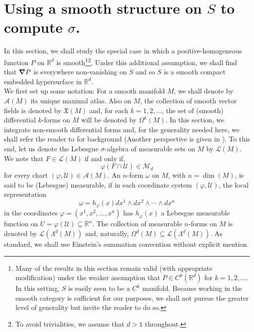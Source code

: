 \documentclass[11pt]{article}
\begin{document}
\section{Using a smooth structure on $S$ to compute $\sigma$.}\label{sec:SigmaForSmoothP}

\noindent In this section, we shall study the special case in which a positive-homogeneous function $P$ on $\mathbb{R}^d$ is smooth\footnote{Many of the results in this section remain valid (with appropriate modification) under the weaker assumption that $P\in C^k(\mathbb{R}^d)$ for $k=1,2,\dots$. In this setting, $S$ is easily seen to be a $C^k$ manifold. Because working in the smooth category is sufficient for our purposes, we shall not pursue the greater level of generality but invite the reader to do so.}\footnote{To avoid trivialities, we assume that $d>1$ throughout.}.
Under this additional assumption, we shall find that $\grad P$ is everywhere non-vanishing on $S$ and so $S$ is a smooth compact embedded hypersurface in $\mathbb{R}^d$.\\

\noindent We first set up some notation: For a smooth manifold $M$, we shall denote by $\mathcal{A}(M)$ its unique maximal atlas. Also on $M$, the collection of smooth vector fields is denoted by $\mathfrak{X}(M)$ and, for each $k=1,2,\dots$, the set of (smooth) differential $k$-forms on $M$ will be denoted by $\Omega^k(M)$.  In this section, we integrate non-smooth differential forms and, for the generality needed here, we shall refer the reader to \cite{Naber2011} for background (Another perspective is given in \cite{Amann2009}). To this end, let us denote the Lebesgue $\sigma$-algebra of measurable sets on $M$ by $\mathcal{L}(M)$. We note that $F\in\mathcal{L}(M)$ if and only if, \begin{equation*}
    \varphi(F\cap \mathcal{U})\in\mathcal{M}_d
\end{equation*}
for every chart $(\varphi,\mathcal{U})\in\mathcal{A}(M)$. An $n$-form $\omega$ on $M$, with $n=\dim(M)$, is said to be (Lebesgue) measurable, if in each coordinate system $(\varphi,\mathcal{U})$, the local representation
\begin{equation*}
    \omega=h_{\varphi}(x)dx^1\wedge dx^2\wedge \cdots\wedge dx^n
\end{equation*}
in the coordinates $\varphi=(x^1,x^2,\dots,x^n)$ has $h_{\varphi}(x)$ a Lebesgue measurable function on $U=\varphi(\mathcal{U})\subseteq\mathbb{R}^n$. The collection of measurable $n$-forms on $M$ is denoted by $\mathcal{L}(\Lambda^d(M))$ and, naturally, $\Omega^{d}(M)\subseteq \mathcal{L}(\Lambda^d(M))$. As standard, we shall use Einstein's summation convention without explicit mention.\\
\end{document}
